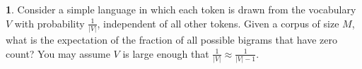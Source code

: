 \textbf{1}. Consider a simple language in which each token is drawn from the vocabulary $V$ with probability $\frac{1}{\vert V \vert}$, independent of all other tokens. Given a corpus of size $M$, what is the expectation of the fraction of all possible bigrams that have zero count? You may assume $V$ is large enough that $\frac{1}{\vert V \vert} \approx \frac{1}{\vert V \vert - 1}$.
